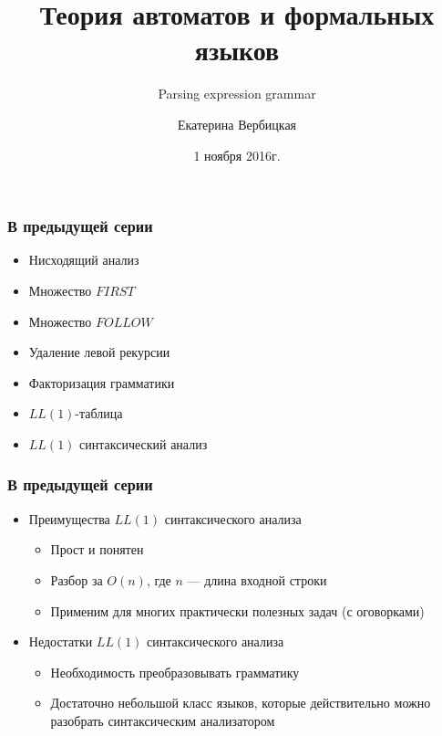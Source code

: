 \documentclass{beamer}
\title[]{Теория автоматов и формальных языков}
\subtitle[]{Parsing expression grammar}
\institute[]{
Санкт-Петербургский государственный электротехнический университет <<ЛЭТИ>>\\
}
\author[]{Екатерина Вербицкая}
\date{1 ноября 2016г.}
\begin{document}
{
  \begin{frame}
    \titlepage
  \end{frame}
}

\begin{frame}[fragile]
  \transwipe[direction=90]
  \frametitle{В предыдущей серии}
  \begin{itemize}
    \item Нисходящий анализ
    \item Множество $FIRST$
    \item Множество $FOLLOW$
    \item Удаление левой рекурсии
    \item Факторизация грамматики
    \item $LL(1)$-таблица
    \item $LL(1)$ синтаксический анализ
  \end{itemize}
\end{frame}

\begin{frame}[fragile]
  \transwipe[direction=90]
  \frametitle{В предыдущей серии}
  \begin{itemize}
	\item Преимущества $LL(1)$ синтаксического анализа
	\begin{itemize}
	  \item Прост и понятен
	  \item Разбор за $O(n)$, где $n$ --- длина входной строки
	  \item Применим для многих практически полезных задач (с оговорками)
	\end{itemize}
    \item Недостатки $LL(1)$ синтаксического анализа
    \begin{itemize}
      \item Необходимость преобразовывать грамматику
      \item Достаточно небольшой класс языков, которые действительно можно разобрать синтаксическим анализатором
    \end{itemize}
  \end{itemize}
\end{frame}
\end{document}

